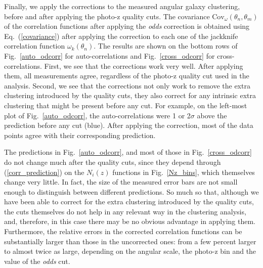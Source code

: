 Finally, we apply the corrections to the measured angular galaxy clustering, before and after applying the photo-z quality cuts. 
The covariance $\text{Cov}_\omega(\theta_n , \theta_m )$ of the correlation functions after applying the \textit{odds} correction is obtained using Eq.~(\ref{covariance}) after applying the correction to each one of the jackknife correlation function $\omega_k(\theta_n)$.
The results are shown on the bottom rows of Fig.~\ref{auto_odcorr} for auto-correlations and Fig.~\ref{cross_odcorr} for cross-correlations. 
First, we see that the corrections work very well. After applying them, all measurements agree, regardless of the photo-z quality cut used in the analysis. 
Second, we see that the corrections not only work to remove the extra clustering introduced by the quality cuts, they also correct for any intrinsic extra clustering that might be present before any cut. For example, on the left-most plot of Fig.~\ref{auto_odcorr}, the auto-correlations were 1 or 2$\sigma$ above the prediction before any cut (blue). 
After applying the correction, most of the data points agree with their corresponding prediction.

The predictions in Fig.~\ref{auto_odcorr}, and most of those in Fig.~\ref{cross_odcorr} do not change much after the quality cuts, since they depend through (\ref{corr_prediction}) on the $N_i(z)$ functions in Fig.~\ref{Nz_bins},
which themselves change very little. In fact, the size of the measured error bars are not small enough to distinguish between different predictions. So much so that, although we have been able to correct for the extra clustering introduced by the quality cuts, the cuts themselves do not help in any relevant way in the clustering analysis, and, therefore, in this case there may be no obvious advantage in applying them. 
Furthermore, the relative errors in the corrected correlation functions can be substantially larger than those in the uncorrected ones: 
from a few percent larger to almost twice as large, depending on the angular scale, the photo-z bin and the value of the {\em odds} cut.

